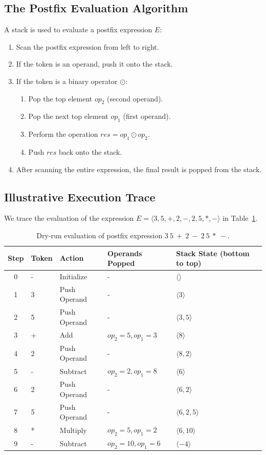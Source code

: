 \documentclass[10pt,journal,compsoc,onecolumn]{IEEEtran}
\begin{document}
\subsection{The Postfix Evaluation Algorithm}
A stack is used to evaluate a postfix expression $E$:
\begin{enumerate}
    \item Scan the postfix expression from left to right.
    \item If the token is an operand, push it onto the stack.
    \item If the token is a binary operator $\odot$:
        \begin{enumerate}
            \item Pop the top element $op_2$ (second operand).
            \item Pop the next top element $op_1$ (first operand).
            \item Perform the operation $res = op_1 \odot op_2$.
            \item Push $res$ back onto the stack.
        \end{enumerate}
    \item After scanning the entire expression, the final result is popped from the stack.
\end{enumerate}

\subsection{Illustrative Execution Trace}
We trace the evaluation of the expression $E = \langle 3, 5, +, 2, -, 2, 5, *, - \rangle$ in Table~\ref{tab:trace}.

\begin{table}[htbp]
\centering
\caption{Dry-run evaluation of postfix expression $3\ 5\ +\ 2\ -\ 2\ 5\ *\ -$.}
\label{tab:trace}
\begin{tabular}{cllll}
\toprule
Step & Token & Action & Operands Popped & Stack State (bottom to top) \\
\midrule
0 & - & Initialize & - & $\langle \rangle$ \\
1 & 3 & Push Operand & - & $\langle 3 \rangle$ \\
2 & 5 & Push Operand & - & $\langle 3, 5 \rangle$ \\
3 & + & Add & $op_2=5, op_1=3$ & $\langle 8 \rangle$ \\
4 & 2 & Push Operand & - & $\langle 8, 2 \rangle$ \\
5 & - & Subtract & $op_2=2, op_1=8$ & $\langle 6 \rangle$ \\
6 & 2 & Push Operand & - & $\langle 6, 2 \rangle$ \\
7 & 5 & Push Operand & - & $\langle 6, 2, 5 \rangle$ \\
8 & * & Multiply & $op_2=5, op_1=2$ & $\langle 6, 10 \rangle$ \\
9 & - & Subtract & $op_2=10, op_1=6$ & $\langle -4 \rangle$ \\
\bottomrule
\end{tabular}
\end{table}
\end{document}

